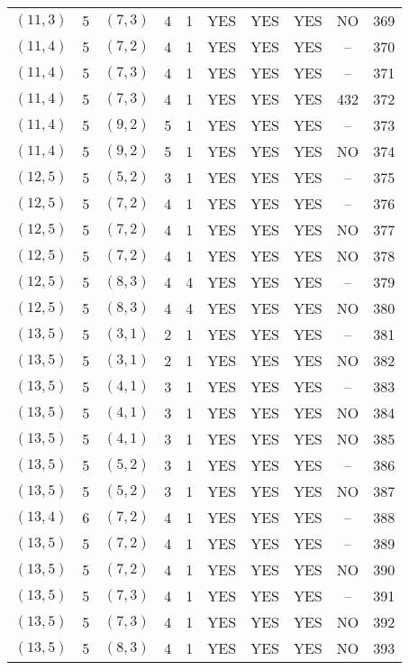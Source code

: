 \begin{longtable}{|c|c|c|c|c|c|c|c|c|c|}
$(11, 3)$ & 5 & $(7, 3)$ & 4 & 1 & YES & YES & YES & NO & 369\\
$(11, 4)$ & 5 & $(7, 2)$ & 4 & 1 & YES & YES & YES & -- & 370\\
$(11, 4)$ & 5 & $(7, 3)$ & 4 & 1 & YES & YES & YES & -- & 371\\
$(11, 4)$ & 5 & $(7, 3)$ & 4 & 1 & YES & YES & YES & 432 & 372\\
$(11, 4)$ & 5 & $(9, 2)$ & 5 & 1 & YES & YES & YES & -- & 373\\
$(11, 4)$ & 5 & $(9, 2)$ & 5 & 1 & YES & YES & YES & NO & 374\\
$(12, 5)$ & 5 & $(5, 2)$ & 3 & 1 & YES & YES & YES & -- & 375\\
$(12, 5)$ & 5 & $(7, 2)$ & 4 & 1 & YES & YES & YES & -- & 376\\
$(12, 5)$ & 5 & $(7, 2)$ & 4 & 1 & YES & YES & YES & NO & 377\\
$(12, 5)$ & 5 & $(7, 2)$ & 4 & 1 & YES & YES & YES & NO & 378\\
$(12, 5)$ & 5 & $(8, 3)$ & 4 & 4 & YES & YES & YES & -- & 379\\
$(12, 5)$ & 5 & $(8, 3)$ & 4 & 4 & YES & YES & YES & NO & 380\\
$(13, 5)$ & 5 & $(3, 1)$ & 2 & 1 & YES & YES & YES & -- & 381\\
$(13, 5)$ & 5 & $(3, 1)$ & 2 & 1 & YES & YES & YES & NO & 382\\
$(13, 5)$ & 5 & $(4, 1)$ & 3 & 1 & YES & YES & YES & -- & 383\\
$(13, 5)$ & 5 & $(4, 1)$ & 3 & 1 & YES & YES & YES & NO & 384\\
$(13, 5)$ & 5 & $(4, 1)$ & 3 & 1 & YES & YES & YES & NO & 385\\
$(13, 5)$ & 5 & $(5, 2)$ & 3 & 1 & YES & YES & YES & -- & 386\\
$(13, 5)$ & 5 & $(5, 2)$ & 3 & 1 & YES & YES & YES & NO & 387\\
$(13, 4)$ & 6 & $(7, 2)$ & 4 & 1 & YES & YES & YES & -- & 388\\
$(13, 5)$ & 5 & $(7, 2)$ & 4 & 1 & YES & YES & YES & -- & 389\\
$(13, 5)$ & 5 & $(7, 2)$ & 4 & 1 & YES & YES & YES & NO & 390\\
$(13, 5)$ & 5 & $(7, 3)$ & 4 & 1 & YES & YES & YES & -- & 391\\
$(13, 5)$ & 5 & $(7, 3)$ & 4 & 1 & YES & YES & YES & NO & 392\\
$(13, 5)$ & 5 & $(8, 3)$ & 4 & 1 & YES & YES & YES & NO & 393\\

\end{longtable}
